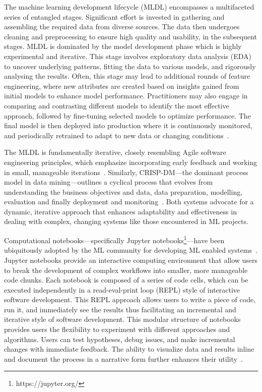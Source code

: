 The machine learning development lifecycle (MLDL) encompasses a multifaceted series of entangled stages. Significant effort is invested in gathering and assembling the required data from diverse sources. The data then undergoes cleaning and preprocessing to ensure high quality and usability, in the subsequent stages. MLDL is dominated by the model development phase which is highly experimental and iterative. This stage involves exploratory data analysis (EDA) to uncover underlying patterns, fitting the data to various models, and rigorously analysing the results. Often, this stage may lead to additional rounds of feature engineering, where new attributes are created based on insights gained from initial models to enhance model performance. Practitioners may also engage in comparing and contrasting different models to identify the most effective approach, followed by fine-tuning selected models to optimize performance. The final model is then deployed into production where it is continuously monitored, and periodically retrained to adapt to new data or changing conditions~\cite{haakman2021ai,amershi2019software,sculley2015hidden}.

The MLDL is fundamentally iterative, closely resembling Agile software engineering principles, which emphasize incorporating early feedback and working in small, manageable iterations~\cite{betz2018managing}. Similarly, CRISP-DM---the dominant process model in data mining---outlines a cyclical process that evolves from understanding the business objectives and data, data preparation, modelling, evaluation and finally deployment and monitoring~\cite{martinez-plumed2021crisp-dm}. Both systems advocate for a dynamic, iterative approach that enhances adaptability and effectiveness in dealing with complex, changing systems like those encountered in ML projects.

Computational notebooks---specifically Jupyter notebooks\footnote{https://jupyter.org/}---have been ubiquitously adopted by the ML community for developing ML enabled systems~\cite{pimentel2019large-scale,quaranta2021kgtorrent,psallidas2019data,perkel2018why}. Jupyter notebooks provide an interactive computing environment that allow users to break the development of complex workflows into smaller, more manageable code chunks. Each notebook is composed of a series of code cells, which can be executed independently in a read-eval-print loop (REPL) style of interactive software development. This REPL approach allows users to write a piece of code, run it, and immediately see the results thus facilitating an incremental and iterative style of software development. This modular structure of notebooks provides users the flexibility to experiment with different approaches and algorithms. Users can test hypotheses, debug issues, and make incremental changes with immediate feedback. The ability to visualize data and results inline and document the process in a narrative form further enhances their utility~\cite{kery2018story,head2019managing,rule2018exploration,chattopadhyay2020whats}.

